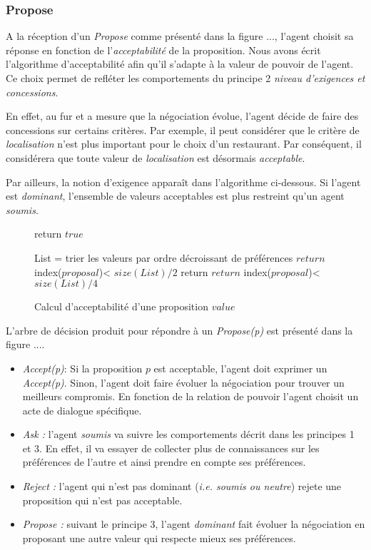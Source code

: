 		\subsubsection{Propose}
			A la réception d'un \emph{Propose} comme présenté dans la figure ..., l'agent choisit sa réponse en fonction de l'\emph{acceptabilité} de la proposition.
			Nous avons écrit l'algorithme d'acceptabilité afin qu'il s'adapte à la valeur de pouvoir de l'agent. Ce choix permet de refléter les comportements du principe 2 \emph{niveau d'exigences et concessions}.
			
			En effet, au fur et a mesure que la négociation évolue, l'agent décide de faire des concessions sur certains critères. Par exemple, il peut considérer que le critère de \emph{localisation} n'est plus important pour le choix d'un restaurant. Par conséquent, il considérera que toute valeur de \emph{localisation} est désormais \emph{acceptable}.
			
			Par ailleurs, la notion d'exigence apparaît dans l'algorithme ci-dessous. Si l'agent est \emph{dominant}, l'ensemble de valeurs acceptables est plus restreint qu'un agent \emph{soumis}.
			
			\begin{figure}[]
				\begin{algorithmic}[1]\small
					\State return $true$
					\EndIf
					
					\State List = trier les valeurs par ordre décroissant de préférences
					\State $return$ index($proposal$)< $size(List)/2$
					\EndIf
					\State return $return$ index($proposal$)< $size(List)/4$
					\EndIf
					\EndFunction
				\end{algorithmic}
				\vskip 8pt
				\label{pseudo}
				\caption{Calcul d'acceptabilité d'une proposition $value$}
			\end{figure} 
			
			
			L'arbre de décision produit pour répondre à un \emph{Propose(p)} est présenté dans la figure .... 
			\begin{itemize}
			
				\item  \emph{Accept(p)}: Si la proposition $p$ est acceptable, l'agent doit exprimer un \emph{Accept(p)}. Sinon, l'agent doit faire évoluer la négociation pour trouver un meilleurs compromis. En fonction de la relation de pouvoir l'agent choisit un acte de dialogue spécifique.
				\item \emph{Ask :} l'agent \emph{soumis} va suivre les comportements décrit dans les principes 1 et 3. En effet, il va essayer de collecter plus de connaissances sur les préférences de l'autre et ainsi prendre en compte ses préférences. 
				\item \emph{Reject :} l'agent qui n'est pas dominant (\emph{i.e. soumis ou neutre}) rejete une proposition qui n'est pas acceptable.
				\item \emph{Propose :} suivant le principe 3, l'agent \emph{dominant} fait évoluer la négociation en proposant une autre valeur qui respecte mieux ses préférences. 
			\end{itemize}
	
